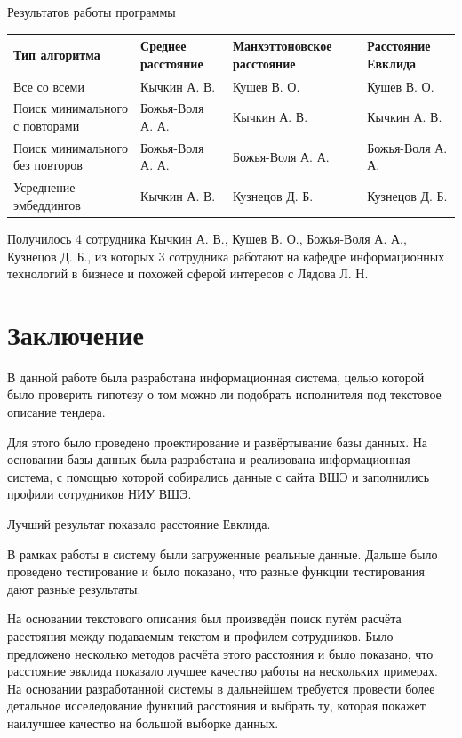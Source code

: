\documentclass[PI,KR]{HSEUniversity}
\begin{document}
\begin{TABLE}[!h]{Результатов работы программы \label{tbl:tableRes}}
	\begin{tabular}[c]{|p{4cm}|l|p{4cm}|l|}
		\hline
		Тип алгоритма        			& Среднее расстояние & Манхэттоновское расстояние & Расстояние Евклида \\ \hline
		Все со всеми		            & Кычкин А. В.       & Кушев В. О.                & Кушев В. О.        \\ \hline
		Поиск минимального с повторами  & Божья-Воля А. А.   & Кычкин А. В.               & Кычкин А. В.       \\ \hline
		Поиск минимального без повторов & Божья-Воля А. А.   & Божья-Воля А. А.           & Божья-Воля А. А.   \\ \hline
		Усреднение эмбеддингов      	& Кычкин А. В.       & Кузнецов Д. Б.             & Кузнецов Д. Б.     \\ \hline
	\end{tabular}
\end{TABLE}

Получилось 4 сотрудника Кычкин А. В., Кушев В. О., Божья-Воля А. А., Кузнецов Д. Б., из которых 3 сотрудника работают на кафедре информационных технологий в бизнесе и похожей сферой интересов с Лядова Л. Н.
\chapter*{Заключение}
В данной работе была разработана информационная система, целью которой было проверить гипотезу о том можно ли подобрать исполнителя под текстовое описание тендера.

Для этого было проведено проектирование и развёртывание базы данных. На основании базы данных была разработана и реализована информационная система, с помощью которой собирались данные с сайта ВШЭ и заполнились профили сотрудников НИУ ВШЭ.

Лучший результат показало расстояние Евклида.

В рамках работы в систему были загруженные реальные данные. Дальше было проведено тестирование и было показано, что разные функции тестирования дают разные результаты.

На основании текстового описания был произведён поиск путём расчёта расстояния между подаваемым текстом и профилем сотрудников. Было предложено несколько методов расчёта этого расстояния и было показано, что расстояние эвклида показало лучшее качество работы на нескольких примерах. На основании разработанной системы в дальнейшем требуется провести более детальное исселедование функций расстояния и выбрать ту, которая покажет наилучшее качество на большой выборке данных.
\putbibliography %
\end{document}
